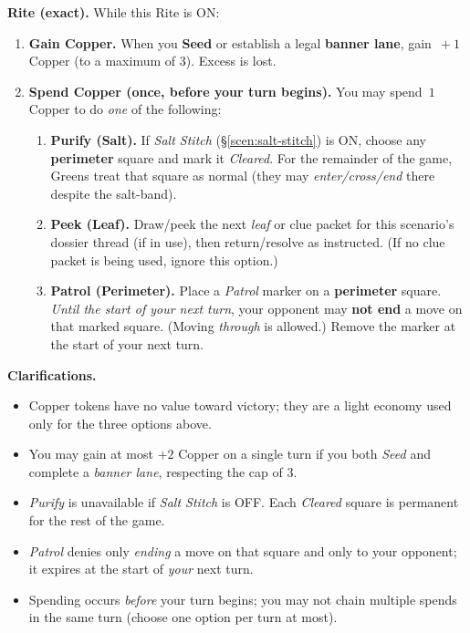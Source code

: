 \documentclass[11pt]{article}
\numberwithin{equation}{section} %
\theoremstyle{plain} %
\theoremstyle{definition} %
\theoremstyle{remark} %
\begin{document}
\medskip
\noindent\textbf{Rite (exact).} While this Rite is \textsc{ON}:
\begin{enumerate}\setlength\itemsep{0.2em}
  \item \textbf{Gain Copper.} When you \textbf{Seed} or establish a legal \textbf{banner lane}, gain \(\,+1\) Copper (to a maximum of 3). Excess is lost.
  \item \textbf{Spend Copper (once, before your turn begins).} You may spend \(\,1\) Copper to do \emph{one} of the following:
  \begin{enumerate}\setlength\itemsep{0.2em}
    \item \textbf{Purify (Salt).} If \emph{Salt Stitch} (\S\ref{scen:salt-stitch}) is \textsc{ON}, choose any \textbf{perimeter} square and mark it \emph{Cleared}. For the remainder of the game, Greens treat that square as normal (they may \emph{enter/cross/end} there despite the salt-band). 
    \item \textbf{Peek (Leaf).} Draw/peek the next \emph{leaf} or clue packet for this scenario’s dossier thread (if in use), then return/resolve as instructed. (If no clue packet is being used, ignore this option.)
    \item \textbf{Patrol (Perimeter).} Place a \emph{Patrol} marker on a \textbf{perimeter} square. \textit{Until the start of your next turn}, your opponent may \textbf{not end} a move on that marked square. (Moving \emph{through} is allowed.) Remove the marker at the start of your next turn.
  \end{enumerate}
\end{enumerate}

\medskip
\noindent\textbf{Clarifications.}
\begin{itemize}\setlength\itemsep{0.25em}
  \item Copper tokens have no value toward victory; they are a light economy used only for the three options above.
  \item You may gain at most \(+2\) Copper on a single turn if you both \emph{Seed} and complete a \emph{banner lane}, respecting the cap of 3.
  \item \textit{Purify} is unavailable if \emph{Salt Stitch} is \textsc{OFF}. Each \emph{Cleared} square is permanent for the rest of the game.
  \item \textit{Patrol} denies only \emph{ending} a move on that square and only to your opponent; it expires at the start of \emph{your} next turn.
  \item Spending occurs \emph{before} your turn begins; you may not chain multiple spends in the same turn (choose one option per turn at most).
\end{itemize}
\end{document}
